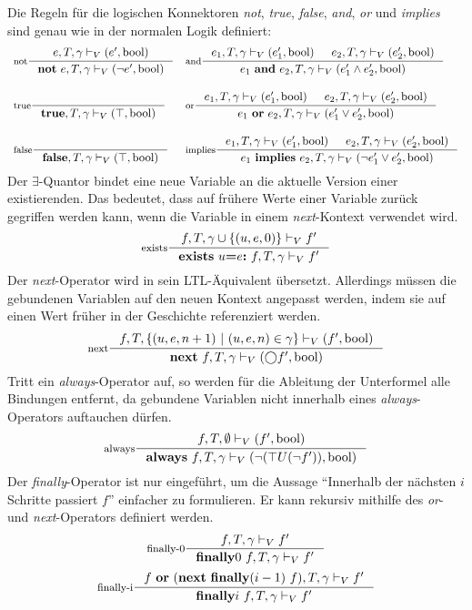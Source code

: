 Die Regeln für die logischen Konnektoren \emph{not}, \emph{true}, \emph{false}, \emph{and}, \emph{or} und \emph{implies} sind genau wie in der normalen Logik definiert:
\[
\begin{array}{ll}
  \inference[not]{e,T,\gamma\vdash_V (e',\textrm{bool})}{\textbf{not}\ e,T,\gamma\vdash_V (\lnot e',\textrm{bool})} &
  \inference[and]{e_1,T,\gamma\vdash_V (e_1',\textrm{bool}) & e_2,T,\gamma\vdash_V (e_2',\textrm{bool})}{e_1\ \textbf{and}\ e_2,T,\gamma\vdash_V (e_1'\land e_2',\textrm{bool})}\\[20pt]
  \inference[true]{}{\textbf{true},T,\gamma\vdash_V(\top,\textrm{bool})} &
  \inference[or]{e_1,T,\gamma\vdash_V (e_1',\textrm{bool}) & e_2,T,\gamma\vdash_V (e_2',\textrm{bool})}{e_1\ \textbf{or}\ e_2,T,\gamma\vdash_V (e_1'\lor e_2',\textrm{bool})}\\[20pt]
  \inference[false]{}{\textbf{false},T,\gamma\vdash_V(\top,\textrm{bool})} &
  \inference[implies]{e_1,T,\gamma\vdash_V (e_1',\textrm{bool}) & e_2,T,\gamma\vdash_V (e_2',\textrm{bool})}{e_1\ \textbf{implies}\ e_2,T,\gamma\vdash_V (\lnot e_1'\lor e_2',\textrm{bool})}
\end{array}
\]
Der $\exists$-Quantor bindet eine neue Variable an die aktuelle Version einer existierenden.
Das bedeutet, dass auf frühere Werte einer Variable zurück gegriffen werden kann, wenn die Variable in einem \emph{next}-Kontext verwendet wird.
\[
\inference[exists]{f,T,\gamma\cup\{(u,e,0)\}\vdash_V f'}{\textbf{exists}\ u\textbf{=}e\textbf{:}\ f,T,\gamma\vdash_V f'}
\]
Der \emph{next}-Operator wird in sein LTL-Äquivalent übersetzt.
Allerdings müssen die gebundenen Variablen auf den neuen Kontext angepasst werden, indem sie auf einen Wert früher in der Geschichte referenziert werden.
\[
\inference[next]{f,T,\{ (u,e,n+1)\ |\ (u,e,n)\in\gamma\}\vdash_V (f',\textrm{bool})}{\textbf{next}\ f,T,\gamma\vdash_V (\bigcirc f',\textrm{bool})}
\]
Tritt ein \emph{always}-Operator auf, so werden für die Ableitung der Unterformel alle Bindungen entfernt, da gebundene Variablen nicht innerhalb eines \emph{always}-Operators auftauchen dürfen.
\[
\inference[always]{f,T,\emptyset\vdash_V (f',\textrm{bool})}{\textbf{always}\ f,T,\gamma\vdash_V (\lnot(\top U (\lnot f')),\textrm{bool})}
\]
Der \emph{finally}-Operator ist nur eingeführt, um die Aussage "`Innerhalb der nächsten $i$ Schritte passiert $f$"' einfacher zu formulieren.
Er kann rekursiv mithilfe des \emph{or}- und \emph{next}-Operators definiert werden.
\[
\inference[finally-0]{f,T,\gamma\vdash_V f'}{\textbf{finally}0\ f,T,\gamma\vdash_V f'}
\]
\[
\inference[finally-i]{f\ \textbf{or}\ (\textbf{next}\ \textbf{finally}(i-1)\ f),T,\gamma\vdash_V f'}{\textbf{finally}i\ f,T,\gamma\vdash_V f'}
\]

